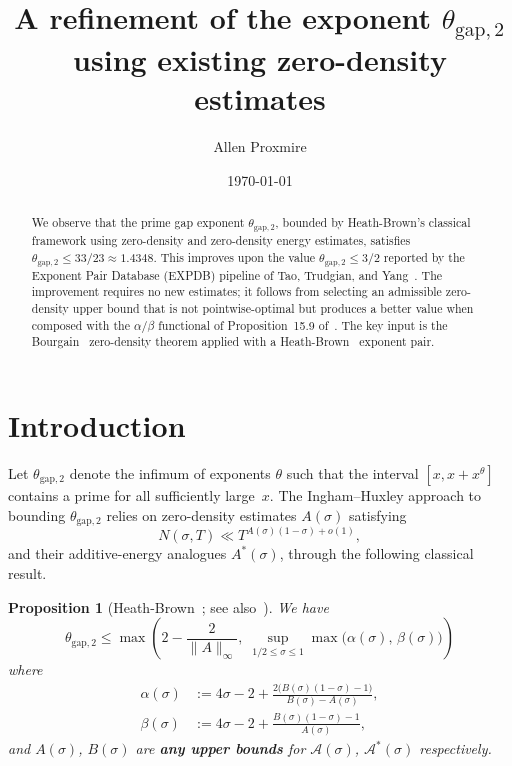\documentclass[11pt,a4paper]{amsart}
\title[A refinement of $\theta_{\mathrm{gap},2}$]{A refinement of the exponent $\theta_{\mathrm{gap},2}$\\using existing zero-density estimates}
\author{Allen Proxmire}
\date{\today}
\theoremstyle{plain}
\newtheorem{proposition}[theorem]{Proposition}
\theoremstyle{definition}
\begin{document}
\begin{abstract}
We observe that the prime gap exponent $\theta_{\mathrm{gap},2}$,
bounded by Heath-Brown's classical framework using zero-density and
zero-density energy estimates, satisfies $\theta_{\mathrm{gap},2} \leq 33/23
\approx 1.4348$. This improves upon the value $\theta_{\mathrm{gap},2} \leq 3/2$
reported by the Exponent Pair Database (EXPDB) pipeline of Tao,
Trudgian, and Yang~\cite{TTY25}. The improvement requires no new
estimates; it follows from selecting an admissible zero-density
upper bound that is not pointwise-optimal but produces a better
value when composed with the $\alpha/\beta$ functional of
Proposition~15.9 of~\cite{TTY25}. The key input is the
Bourgain~\cite{Bourgain1995} zero-density theorem applied with
a Heath-Brown~\cite{HeathBrown2017} exponent pair.
\end{abstract}

\maketitle

\section{Introduction}

Let $\theta_{\mathrm{gap},2}$ denote the infimum of exponents $\theta$ such that the interval $[x, x + x^\theta]$ contains a prime for all sufficiently large~$x$. The Ingham--Huxley approach to bounding $\theta_{\mathrm{gap},2}$ relies on zero-density estimates $A(\sigma)$ satisfying
\[
N(\sigma, T) \ll T^{A(\sigma)(1-\sigma) + o(1)},
\]
and their additive-energy analogues $A^*(\sigma)$, through the following classical result.

\begin{proposition}[{Heath-Brown~\cite[Lemma~2]{HeathBrown1979}; see also~\cite[Proposition~15.9]{TTY25}}]
\label{prop:gapsquare}
We have
\[
\theta_{\mathrm{gap},2} \leq \max\!\left( 2 - \frac{2}{\|A\|_\infty},\; \sup_{1/2 \leq \sigma \leq 1} \max\bigl(\alpha(\sigma),\, \beta(\sigma)\bigr)\right)
\]
where
\begin{align}
\alpha(\sigma) &:= 4\sigma - 2 + \frac{2\bigl(B(\sigma)(1-\sigma) - 1\bigr)}{B(\sigma) - A(\sigma)}, \label{eq:alpha}\\[4pt]
\beta(\sigma) &:= 4\sigma - 2 + \frac{B(\sigma)(1-\sigma) - 1}{A(\sigma)}, \label{eq:beta}
\end{align}
and $A(\sigma)$, $B(\sigma)$ are \textbf{any upper bounds} for $\mathcal{A}(\sigma)$, $\mathcal{A}^*(\sigma)$ respectively.
\end{proposition}
\end{document}
